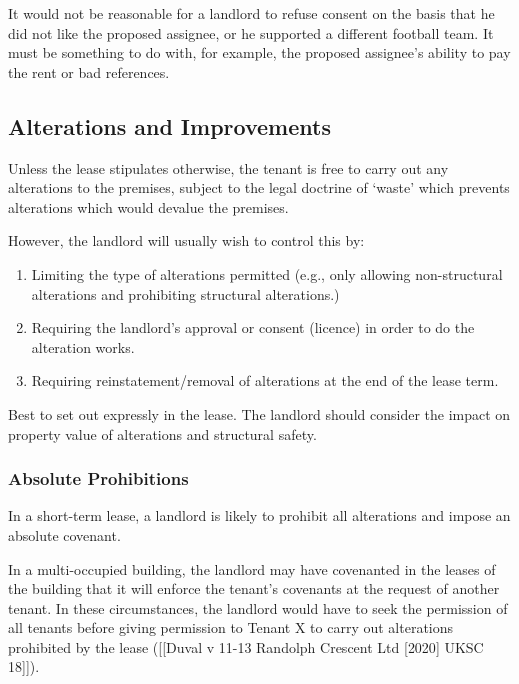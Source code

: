 \documentclass[
]{article}
\newenvironment{Shaded}{}{}
\newcommand{\NormalTok}[1]{#1}
\providecommand{\tightlist}{%
  \setlength{\itemsep}{0pt}\setlength{\parskip}{0pt}}
\begin{document}
\begin{Shaded}
\begin{Highlighting}[]
\NormalTok{It would not be reasonable for a landlord to refuse consent on the basis that he did not like the proposed assignee, or he supported a different football team. It must be something to do with, for example, the proposed assignee’s ability to pay the rent or bad references.}
\end{Highlighting}
\end{Shaded}

\hypertarget{alterations-and-improvements}{%
\subsection{Alterations and
Improvements}\label{alterations-and-improvements}}

Unless the lease stipulates otherwise, the tenant is free to carry out
any alterations to the premises, subject to the legal doctrine of
`waste' which prevents alterations which would devalue the premises.

However, the landlord will usually wish to control this by:

\begin{enumerate}
\def\labelenumi{\arabic{enumi}.}
\tightlist
\item
  Limiting the type of alterations permitted (e.g., only allowing
  non-structural alterations and prohibiting structural alterations.)
\item
  Requiring the landlord's approval or consent (licence) in order to do
  the alteration works.
\item
  Requiring reinstatement/removal of alterations at the end of the lease
  term.
\end{enumerate}

Best to set out expressly in the lease. The landlord should consider the
impact on property value of alterations and structural safety.

\hypertarget{absolute-prohibitions}{%
\subsubsection{Absolute Prohibitions}\label{absolute-prohibitions}}

In a short-term lease, a landlord is likely to prohibit all alterations
and impose an absolute covenant.

In a multi-occupied building, the landlord may have covenanted in the
leases of the building that it will enforce the tenant's covenants at
the request of another tenant. In these circumstances, the landlord
would have to seek the permission of all tenants before giving
permission to Tenant X to carry out alterations prohibited by the lease
({[}{[}Duval v 11-13 Randolph Crescent Ltd {[}2020{]} UKSC 18{]}{]}).
\end{document}
